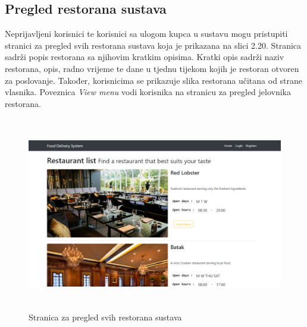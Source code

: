 \documentclass[times, utf8, zavrsni, numeric]{fer}
\begin{document}
\subsection{Pregled restorana sustava}
Neprijavljeni korisnici te korisnici sa ulogom kupca u sustavu mogu pristupiti stranici za pregled svih restorana sustava koja je prikazana na slici 2.20. Stranica sadrži popis restorana sa njihovim kratkim opisima. Kratki opis sadrži naziv restorana, opis, radno vrijeme te dane u tjednu tijekom kojih je restoran otvoren za poslovanje. Također, korisnicima se prikazuje slika restorana učitana od strane vlasnika. Poveznica \emph{View menu} vodi korisnika na stranicu za pregled jelovnika restorana.
\begin{figure}[htb]
\centering
\includegraphics[height=8.5cm]{restaurants.png}
\caption{Stranica za pregled svih restorana sustava}
\label{fig:allRest}
\end{figure}
\end{document}
